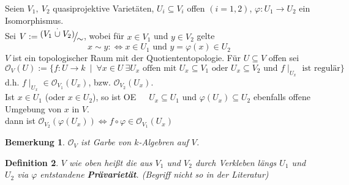 \documentclass[a4paper,12pt]{report}
\theoremstyle{break}
\newtheorem{Def}{Definition}[section]
\newtheorem{Bem}[Def]{Bemerkung}
\theoremstyle{nonumberbreak}
\theoremstyle{nonumberplain}
\newcommand{\emp}[1]{\textbf{\emph{#1}}}
\newcommand{\begriff}[1]{{\index{#1}}\emp{#1}}
\newcommand{\FakRaum}[2]{
  \raisebox{0.7ex}{\ensuremath{#1}}
  \ensuremath{\mkern-3mu}\big/\ensuremath{\mkern-3mu}
  \raisebox{-0.6ex}{\ensuremath{#2}}}
\renewcommand{\OE}{O\!\!E~}
\begin{document}
Seien $V_1,~V_2$ quasiprojektive Varietäten, $U_i\subseteq V_i$ offen $(i=1,2)$, $\varphi: U_1 \rightarrow U_2$ ein Isomorphismus.\\
Sei $V:=\FakRaum{(V_1\stackrel{\cdot}{\cup} V_2)}{\sim}$, wobei für $x\in V_1$ und $y\in V_2$ gelte 
$$x\sim y :\Leftrightarrow x\in U_1 \text{ und } y=\varphi(x)\in U_2$$
$V$ ist ein topologischer Raum mit der Quotiententopologie.
Für $U\subseteq V$ offen sei
$$\mathcal{O}_V(U):=\{f: U\rightarrow k~\mid~\forall x\in U ~\exists U_x \text{ offen mit } U_x\subseteq V_1 \text{ oder } U_x\subseteq V_2 \text{ und } f\mid_{U_x} \text{ ist regulär}\}$$
d.h. $f\mid_{U_x}\in\mathcal{O}_{V_1}(U_x)$, bzw. $\mathcal{O}_{V_2}(U_x)$.\\
Ist $x\in U_1$ (oder $x\in U_2$), so ist \OE~~$U_x\subseteq U_1$ und $\varphi(U_x)\subseteq U_2$ ebenfalls offene Umgebung von $x$ in $V$.\\
dann ist $\mathcal{O}_{V_2}(\varphi(U_x))\Leftrightarrow f\circ\varphi\in\mathcal{O}_{V_1}(U_x)$
\begin{Bem}
\label{bem:13.1}
$\mathcal{O}_V$ ist Garbe von $k$-Algebren auf $V$.
\end{Bem}

\begin{Def}
\label{def:13.2}
$V$ wie oben heißt die aus $V_1$ und $V_2$ durch Verkleben längs $U_1$ und $U_2$ via $\varphi$ entstandene \begriff{Prävarietät}. (Begriff nicht so in der Literatur) 
\end{Def}
\end{document}
